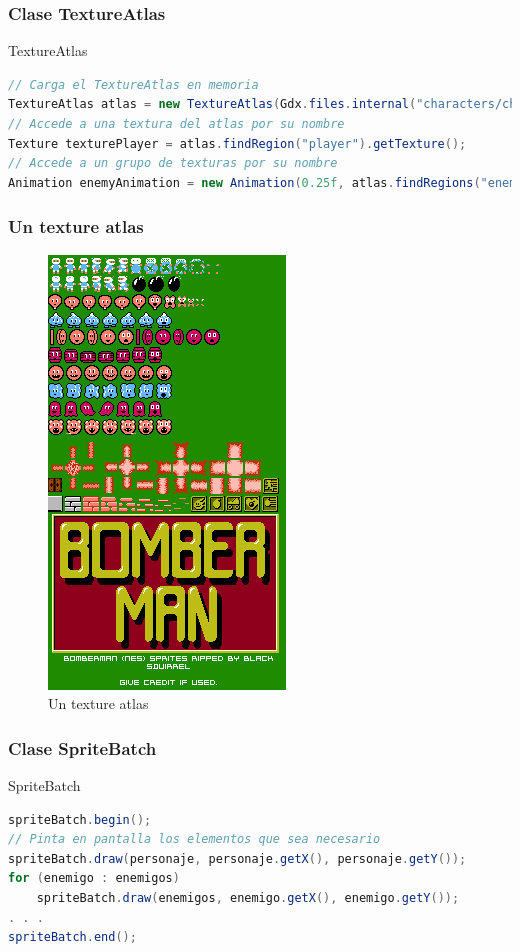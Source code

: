 \documentclass[xcolor={dvipsnames}]{beamer}
\begin{document}
\begin{frame}[fragile]\frametitle{Clase TextureAtlas}
	\begin{exampleblock}{TextureAtlas}
    \begin{lstlisting}[language=java]
// Carga el TextureAtlas en memoria
TextureAtlas atlas = new TextureAtlas(Gdx.files.internal("characters/characters.pack"));
// Accede a una textura del atlas por su nombre
Texture texturePlayer = atlas.findRegion("player").getTexture();
// Accede a un grupo de texturas por su nombre
Animation enemyAnimation = new Animation(0.25f, atlas.findRegions("enemy"));
    \end{lstlisting}
	\end{exampleblock}
\end{frame}

\begin{frame}\frametitle{Un texture atlas}
    \begin{figure}
    \includegraphics[scale=0.4]{images/textureatlas} 
    \caption{Un texture atlas}
    \end{figure}
\end{frame}

\begin{frame}[fragile]\frametitle{Clase SpriteBatch}
	\begin{exampleblock}{SpriteBatch}
    \begin{lstlisting}[language=java]
spriteBatch.begin();
// Pinta en pantalla los elementos que sea necesario
spriteBatch.draw(personaje, personaje.getX(), personaje.getY());
for (enemigo : enemigos)
    spriteBatch.draw(enemigos, enemigo.getX(), enemigo.getY());
. . .
spriteBatch.end();
    \end{lstlisting}
	\end{exampleblock}
\end{frame}
\end{document}
